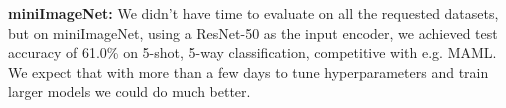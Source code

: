\documentclass{article}
\begin{document}
{}
\textbf{miniImageNet:} We didn't have time to evaluate on all the requested datasets, but on miniImageNet, using a ResNet-50 as the input encoder, we achieved test accuracy of 61.0\% on 5-shot, 5-way classification, competitive with e.g. MAML. We expect that with more than a few days to tune hyperparameters and train larger models we could do much better. \par
\end{document}
